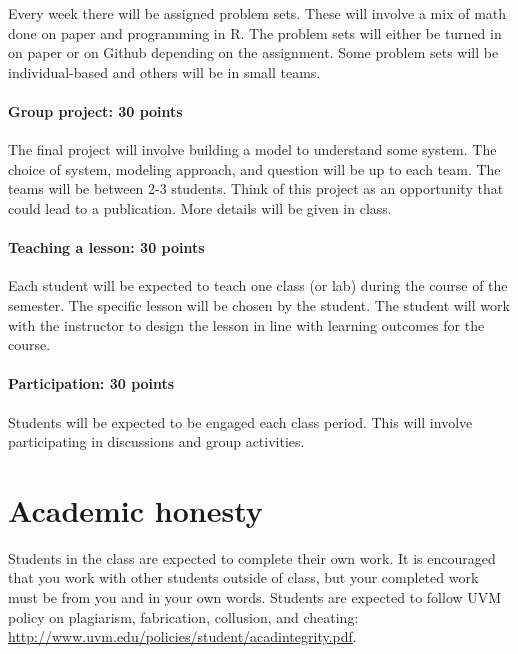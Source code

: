 \documentclass[12pt,]{article}
\let\oldparagraph\paragraph
\renewcommand{\paragraph}[1]{\oldparagraph{#1}\mbox{}}
\begin{document}
Every week there will be assigned problem sets. These will involve a mix
of math done on paper and programming in R. The problem sets will either
be turned in on paper or on Github depending on the assignment. Some
problem sets will be individual-based and others will be in small teams.

\paragraph{Group project: 30 points}\label{group-project-30-points}

The final project will involve building a model to understand some
system. The choice of system, modeling approach, and question will be up
to each team. The teams will be between 2-3 students. Think of this
project as an opportunity that could lead to a publication. More details
will be given in class.

\paragraph{Teaching a lesson: 30
points}\label{teaching-a-lesson-30-points}

Each student will be expected to teach one class (or lab) during the
course of the semester. The specific lesson will be chosen by the
student. The student will work with the instructor to design the lesson
in line with learning outcomes for the course.

\paragraph{Participation: 30 points}\label{participation-30-points}

Students will be expected to be engaged each class period. This will
involve participating in discussions and group activities.

\section{Academic honesty}\label{academic-honesty}

Students in the class are expected to complete their own work. It is
encouraged that you work with other students outside of class, but your
completed work must be from you and in your own words. Students are
expected to follow UVM policy on plagiarism, fabrication, collusion, and
cheating: \url{http://www.uvm.edu/policies/student/acadintegrity.pdf}.
\end{document}
